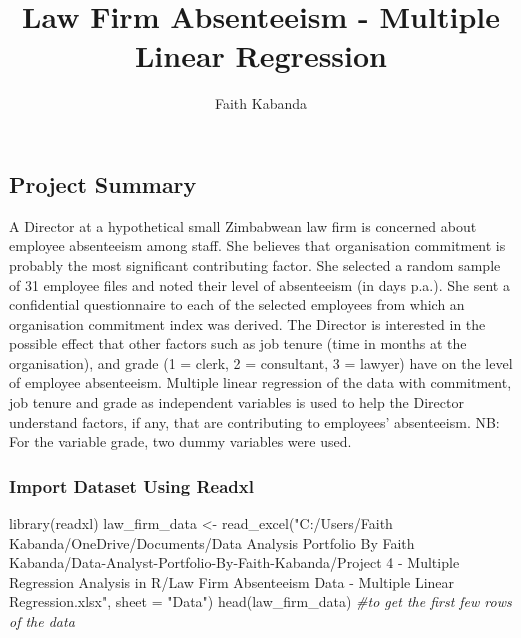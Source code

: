 \documentclass[
]{article}
\title{Law Firm Absenteeism - Multiple Linear Regression}
\author{Faith Kabanda}
\date{}
\newenvironment{Shaded}{\begin{snugshade}}{\end{snugshade}}
\newcommand{\AttributeTok}[1]{\textcolor[rgb]{0.77,0.63,0.00}{#1}}
\newcommand{\CommentTok}[1]{\textcolor[rgb]{0.56,0.35,0.01}{\textit{#1}}}
\newcommand{\FunctionTok}[1]{\textcolor[rgb]{0.00,0.00,0.00}{#1}}
\newcommand{\NormalTok}[1]{#1}
\newcommand{\OtherTok}[1]{\textcolor[rgb]{0.56,0.35,0.01}{#1}}
\newcommand{\StringTok}[1]{\textcolor[rgb]{0.31,0.60,0.02}{#1}}
\begin{document}
\maketitle

{
\setcounter{tocdepth}{2}
\tableofcontents
}
\hypertarget{project-summary}{%
\subsection{Project Summary}\label{project-summary}}

A Director at a hypothetical small Zimbabwean law firm is concerned
about employee absenteeism among staff. She believes that organisation
commitment is probably the most significant contributing factor. She
selected a random sample of 31 employee files and noted their level of
absenteeism (in days p.a.). She sent a confidential questionnaire to
each of the selected employees from which an organisation commitment
index was derived. The Director is interested in the possible effect
that other factors such as job tenure (time in months at the
organisation), and grade (1 = clerk, 2 = consultant, 3 = lawyer) have on
the level of employee absenteeism. Multiple linear regression of the
data with commitment, job tenure and grade as independent variables is
used to help the Director understand factors, if any, that are
contributing to employees' absenteeism. NB: For the variable grade, two
dummy variables were used.

\hypertarget{import-dataset-using-readxl}{%
\subsubsection{Import Dataset Using
Readxl}\label{import-dataset-using-readxl}}

\begin{Shaded}
\begin{Highlighting}[]
\FunctionTok{library}\NormalTok{(readxl)}
\NormalTok{law\_firm\_data }\OtherTok{\textless{}{-}} \FunctionTok{read\_excel}\NormalTok{(}\StringTok{"C:/Users/Faith Kabanda/OneDrive/Documents/Data Analysis Portfolio By Faith Kabanda/Data{-}Analyst{-}Portfolio{-}By{-}Faith{-}Kabanda/Project 4 {-} Multiple Regression Analysis in R/Law Firm Absenteeism Data {-} Multiple Linear Regression.xlsx"}\NormalTok{, }
    \AttributeTok{sheet =} \StringTok{"Data"}\NormalTok{)}
\FunctionTok{head}\NormalTok{(law\_firm\_data) }\CommentTok{\#to get the first few rows of the data}
\end{Highlighting}
\end{Shaded}
\end{document}
